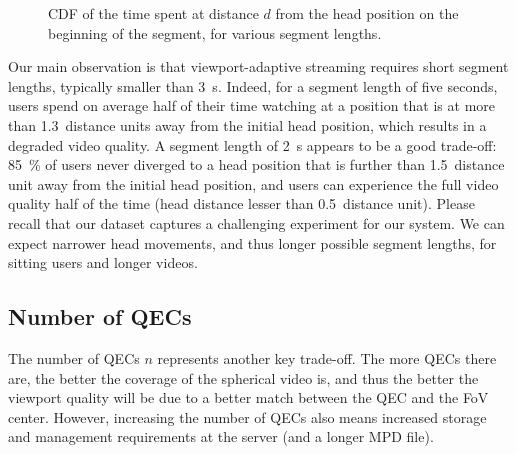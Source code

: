 \begin{figure}
\centering

\caption{CDF of the time spent at distance $d$ from the head position on the beginning of the
segment, for various segment lengths.}\label{cdf-dataset}
\end{figure}

Our main observation is that viewport-adaptive streaming requires
short segment lengths, typically smaller than \SI{3}{\second}. Indeed,
for a segment length of five seconds, users spend on average half of
their time watching at a position that is at more than
\num{1.3}~distance units away from the initial head position, which
results in a degraded video quality. A segment length of
\SI{2}{\second} appears to be a good trade-off: \SI{85}{\percent} of
users never diverged to a head position that is further than
\num{1.5}~distance unit away from the initial head position, and users
can experience the full video quality half of the time (head distance
lesser than \num{0.5}~distance unit). Please recall that our dataset
captures a challenging experiment for our system. We can expect
narrower head movements, and thus longer possible segment lengths, for
sitting users and longer videos.


\subsection{Number of \acp{QEC}}

The number of \acp{QEC} $n$ represents another key trade-off. The more
\acp{QEC} there are, the better the coverage of the spherical video
is, and thus the better the viewport quality will be due to a better
match between the \ac{QEC} and the \ac{FoV} center. However,
increasing the number of \acp{QEC} also means increased storage and
management requirements at the server (and a longer \ac{MPD} file).


